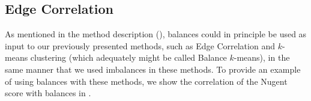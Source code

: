 
\subsection{Edge Correlation}
\label{ch:Balances:sec:Results:sub:EdgeCorrelation}

As mentioned in the method description (),
balances could in principle be used as input to our previously presented methods,
such as Edge Correlation and $k$-means clustering (which adequately might be called Balance $k$-means),
in the same manner that we used imbalances in these methods.
To provide an example of using balances with these methods, 
we show the correlation of the Nugent score with balances in .

